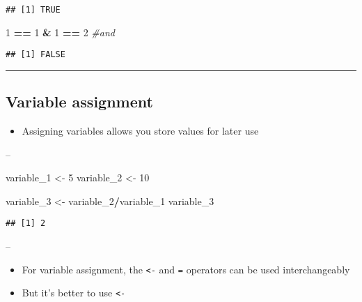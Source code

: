 \documentclass[]{article}
\newenvironment{Shaded}{\begin{snugshade}}{\end{snugshade}}
\newcommand{\CommentTok}[1]{\textcolor[rgb]{0.56,0.35,0.01}{\textit{#1}}}
\newcommand{\DecValTok}[1]{\textcolor[rgb]{0.00,0.00,0.81}{#1}}
\newcommand{\NormalTok}[1]{#1}
\newcommand{\OperatorTok}[1]{\textcolor[rgb]{0.81,0.36,0.00}{\textbf{#1}}}
\newcommand{\StringTok}[1]{\textcolor[rgb]{0.31,0.60,0.02}{#1}}
\providecommand{\tightlist}{%
  \setlength{\itemsep}{0pt}\setlength{\parskip}{0pt}}
\begin{document}
\begin{verbatim}
## [1] TRUE
\end{verbatim}

\begin{Shaded}
\begin{Highlighting}[]
\DecValTok{1} \OperatorTok{==}\StringTok{ }\DecValTok{1} \OperatorTok{&}\StringTok{ }\DecValTok{1} \OperatorTok{==}\StringTok{ }\DecValTok{2} \CommentTok{#and}
\end{Highlighting}
\end{Shaded}

\begin{verbatim}
## [1] FALSE
\end{verbatim}

\begin{center}\rule{0.5\linewidth}{\linethickness}\end{center}

\hypertarget{variable-assignment}{%
\subsection{Variable assignment}\label{variable-assignment}}

\begin{itemize}
\tightlist
\item
  Assigning variables allows you store values for later use
\end{itemize}

--

\begin{Shaded}
\begin{Highlighting}[]
\NormalTok{variable_}\DecValTok{1}\NormalTok{ <-}\StringTok{ }\DecValTok{5}
\NormalTok{variable_}\DecValTok{2}\NormalTok{ <-}\StringTok{ }\DecValTok{10}

\NormalTok{variable_}\DecValTok{3}\NormalTok{ <-}\StringTok{ }\NormalTok{variable_}\DecValTok{2}\OperatorTok{/}\NormalTok{variable_}\DecValTok{1}
\NormalTok{variable_}\DecValTok{3}
\end{Highlighting}
\end{Shaded}

\begin{verbatim}
## [1] 2
\end{verbatim}

--

\begin{itemize}
\tightlist
\item
  For variable assignment, the \texttt{\textless{}-} and \texttt{=}
  operators can be used interchangeably
\item
  But it's better to use \texttt{\textless{}-}
\end{itemize}
\end{document}
